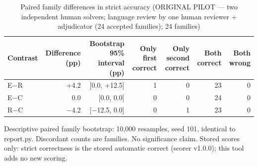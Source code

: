 \begin{table}[t]
\centering
\small
\caption{Paired family differences in strict accuracy (ORIGINAL PILOT --- two independent human solvers; language review by one human reviewer + adjudicator (24 accepted families); 24 families)}
\label{tab:pilotorig-Qwen3-8B-paired}
\begin{tabular}{lrrrrrr}
\toprule
Contrast & Difference (pp) & Bootstrap 95\% interval (pp) & Only first correct & Only second correct & Both correct & Both wrong \\
\midrule
E$-$R & +4.2 & [0.0, +12.5] & 1 & 0 & 23 & 0 \\
E$-$C & 0.0 & [0.0, 0.0] & 0 & 0 & 24 & 0 \\
R$-$C & $-$4.2 & [$-$12.5, 0.0] & 0 & 1 & 23 & 0 \\
\bottomrule
\end{tabular}
\par\smallskip
\parbox{\linewidth}{\footnotesize Descriptive paired family bootstrap: 10,000 resamples, seed 101, identical to report.py. Discordant counts are families. No significance claim. Stored scores only: strict correctness is the stored automatic correct (scorer v1.0.0); this tool adds no new scoring.}
\end{table}
